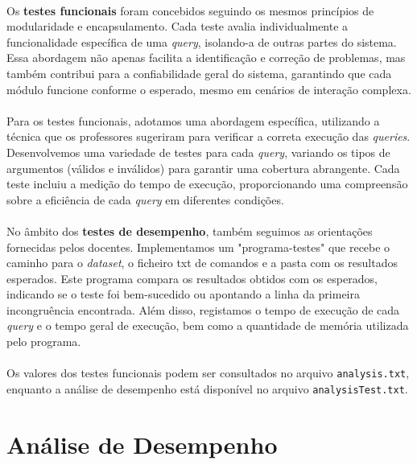 \documentclass{article}
\begin{document}
\paragraph{}Os \textbf{testes funcionais} foram concebidos seguindo os mesmos princípios de modularidade e encapsulamento. Cada teste avalia individualmente a funcionalidade específica de uma \textit{query}, isolando-a de outras partes do sistema. Essa abordagem não apenas facilita a identificação e correção de problemas, mas também contribui para a confiabilidade geral do sistema, garantindo que cada módulo funcione conforme o esperado, mesmo em cenários de interação complexa.
\vspace{-0.3cm}
\paragraph{}Para os testes funcionais, adotamos uma abordagem específica, utilizando a técnica que os professores sugeriram para verificar a correta execução das \textit{queries}. Desenvolvemos uma variedade de testes para cada \textit{query}, variando os tipos de argumentos (válidos e inválidos) para garantir uma cobertura abrangente. Cada teste incluiu a medição do tempo de execução, proporcionando uma compreensão sobre a eficiência de cada \textit{query} em diferentes condições.
\vspace{-0.3cm}
\paragraph{}No âmbito dos \textbf{testes de desempenho}, também seguimos as orientações fornecidas pelos docentes. Implementamos um "programa-testes" que recebe o caminho para o \textit{dataset}, o ficheiro txt de comandos e a pasta com os resultados esperados. Este programa compara os resultados obtidos com os esperados, indicando se o teste foi bem-sucedido ou apontando a linha da primeira incongruência encontrada. Além disso, registamos o tempo de execução de cada \textit{query} e o tempo geral de execução, bem como a quantidade de memória utilizada pelo programa.
\vspace{-0.3cm}
\paragraph{}Os valores dos testes funcionais podem ser consultados no arquivo \texttt{analysis.txt}, enquanto a análise de desempenho está disponível no arquivo \texttt{analysisTest.txt}.


\section{Análise de Desempenho}
\end{document}
